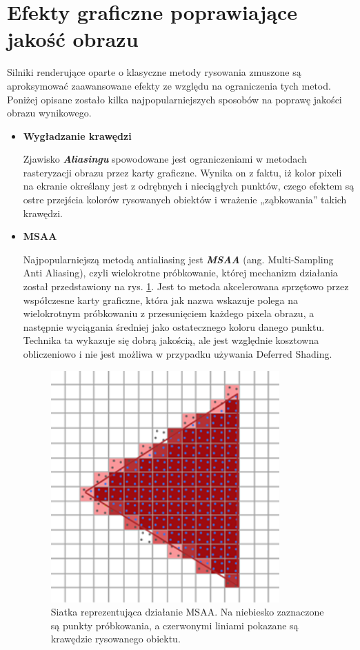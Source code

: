 \section{Efekty graficzne poprawiające jakość obrazu}

Silniki renderujące oparte o klasyczne metody rysowania zmuszone są aproksymować zaawansowane efekty ze względu na ograniczenia tych metod. Poniżej opisane zostało kilka najpopularniejszych sposobów na poprawę jakości obrazu wynikowego.

\begin{itemize}
	\item \textbf{Wygładzanie krawędzi}

	Zjawisko \emph{\textbf{Aliasingu}} spowodowane jest ograniczeniami w metodach rasteryzacji obrazu przez karty graficzne. Wynika on z faktu, iż kolor pixeli na ekranie określany jest z odrębnych i nieciągłych punktów, czego efektem są ostre przejścia kolorów rysowanych obiektów i wrażenie „ząbkowania'' takich krawędzi.
	
	\item \textbf{MSAA}
	
	Najpopularniejszą metodą antialiasing jest \emph{\textbf{MSAA}} (ang. Multi-Sampling Anti Aliasing), czyli wielokrotne próbkowanie, której mechanizm działania został przedstawiony na rys. \ref{intro-msaa}. Jest to metoda akcelerowana sprzętowo przez współczesne karty graficzne, która jak nazwa wskazuje polega na wielokrotnym próbkowaniu z przesunięciem każdego pixela obrazu, a następnie wyciągania średniej jako ostatecznego koloru danego punktu. Technika ta wykazuje się dobrą jakością, ale jest względnie kosztowna obliczeniowo i nie jest możliwa w przypadku używania Deferred Shading.
	
	\begin{figure}[htbp]
		\centering
		\includegraphics[width=3.4483in,height=3.5in]{images/9_MSAA_grid.png}
		\caption{Siatka reprezentująca działanie MSAA. Na niebiesko zaznaczone są punkty próbkowania, a czerwonymi liniami pokazane są krawędzie rysowanego obiektu. \cite{learnopengl:antialiasing:2024}}
		\label{intro-msaa}
	\end{figure}


\end{itemize}
